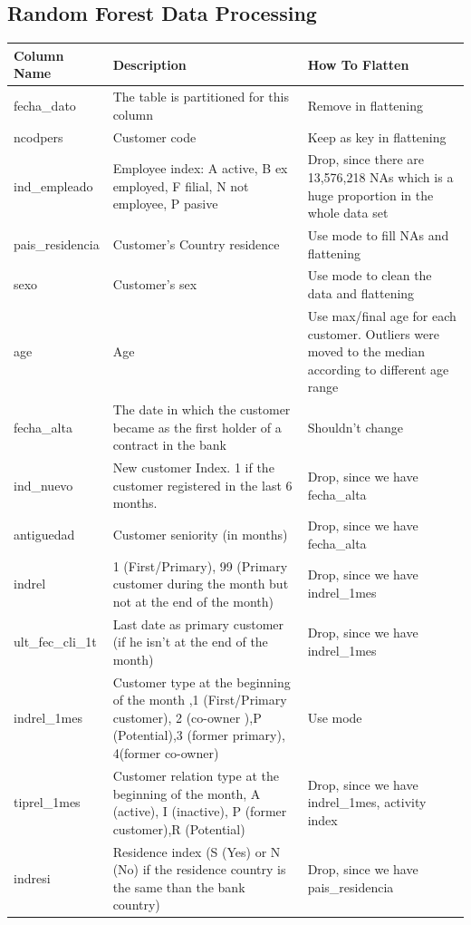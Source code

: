 \documentclass{article}
\begin{document}
\begin{spacing}{1}
\begin{large}
\begin{appendices}
	\section{Random Forest Data Processing}
	\label{appendix:rn_data}
	\begin{longtable}{p{3cm}|p{5cm}|p{5cm}}
		Column Name & Description & How To Flatten  \\
		\hline
		fecha\_dato & The table is partitioned for this column & Remove in flattening \\
		ncodpers & Customer code & Keep as key in flattening \\
		ind\_empleado & Employee index: A active, B ex employed, F filial, N not employee, P pasive & Drop, since there are 13,576,218 NAs which is a huge proportion in the whole data set \\
		pais\_residencia & Customer's Country residence & Use mode to fill NAs and flattening\\
		sexo & Customer's sex & Use mode to clean the data and flattening\\
		age & Age & Use max/final age for each customer. Outliers were moved to the median according to different age range \\
		fecha\_alta & The date in which the customer became as the first holder of a contract in the bank & Shouldn't change \\
		ind\_nuevo & New customer Index. 1 if the customer registered in the last 6 months. & Drop, since we have fecha\_alta \\
		antiguedad & Customer seniority (in months) & Drop, since we have fecha\_alta \\
		indrel & 1 (First/Primary), 99 (Primary customer during the month but not at the end of the month) & Drop, since we have indrel\_1mes \\
		ult\_fec\_cli\_1t & Last date as primary customer (if he isn't at the end of the month) & Drop, since we have indrel\_1mes \\
		indrel\_1mes & Customer type at the beginning of the month ,1 (First/Primary customer), 2 (co-owner ),P (Potential),3 (former primary), 4(former co-owner) & Use mode \\
		tiprel\_1mes & Customer relation type at the beginning of the month, A (active), I (inactive), P (former customer),R (Potential) & Drop, since we have indrel\_1mes, activity index \\
		indresi & Residence index (S (Yes) or N (No) if the residence country is the same than the bank country) & Drop, since we have pais\_residencia \\

\end{longtable}
\end{appendices}
\end{large}
\end{spacing}
\end{document}
